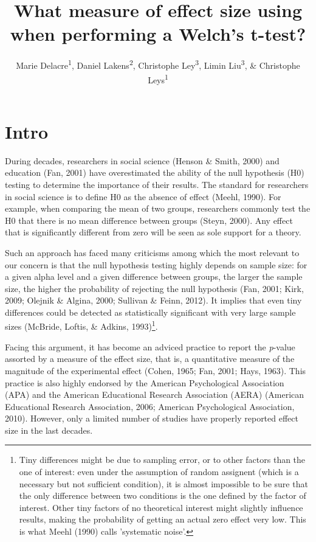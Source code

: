 \documentclass[
  man,floatsintext]{apa6}
\affiliation{
\vspace{0.5cm}
\textsuperscript{1} Université Libre de Bruxelles, Service of Analysis of the Data (SAD), Bruxelles, Belgium\\\textsuperscript{2} Eindhoven University of Technology, Human Technology Interaction Group, Eindhoven, the Netherlands\\\textsuperscript{3} Universiteit Gent, Department of Applied Mathematics, Computer Science and Statistics,4 Gent, Belgium}
\title{What measure of effect size using when performing a Welch's t-test?}
\author{Marie Delacre\textsuperscript{1}, Daniel Lakens\textsuperscript{2}, Christophe Ley\textsuperscript{3}, Limin Liu\textsuperscript{3}, \& Christophe Leys\textsuperscript{1}}
\date{}
\begin{document}
\maketitle

\hypertarget{intro}{%
\section{Intro}\label{intro}}

During decades, researchers in social science (Henson \& Smith, 2000) and education (Fan, 2001) have overestimated the ability of the null hypothesis (H0) testing to determine the importance of their results. The standard for researchers in social science is to define H0 as the absence of effect (Meehl, 1990). For example, when comparing the mean of two groups, researchers commonly test the H0 that there is no mean difference between groups (Steyn, 2000). Any effect that is significantly different from zero will be seen as sole support for a theory.

Such an approach has faced many criticisms among which the most relevant to our concern is that the null hypothesis testing highly depends on sample size: for a given alpha level and a given difference between groups, the larger the sample size, the higher the probability of rejecting the null hypothesis (Fan, 2001; Kirk, 2009; Olejnik \& Algina, 2000; Sullivan \& Feinn, 2012). It implies that even tiny differences could be detected as statistically significant with very large sample sizes (McBride, Loftis, \& Adkins, 1993)\footnote{Tiny differences might be due to sampling error, or to other factors than the one of interest: even under the assumption of random assignent (which is a necessary but not sufficient condition), it is almost impossible to be sure that the only difference between two conditions is the one defined by the factor of interest. Other tiny factors of no theoretical interest might slightly influence results, making the probability of getting an actual zero effect very low. This is what Meehl (1990) calls 'systematic noise'.}.

Facing this argument, it has become an adviced practice to report the \emph{p}-value assorted by a measure of the effect size, that is, a quantitative measure of the magnitude of the experimental effect (Cohen, 1965; Fan, 2001; Hays, 1963). This practice is also highly endorsed by the American Psychological Association (APA) and the American Educational Research Association (AERA) (American Educational Research Association, 2006; American Psychological Association, 2010). However, only a limited number of studies have properly reported effect size in the last decades.
\end{document}
